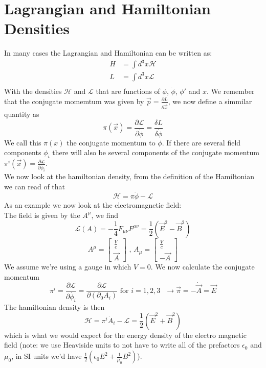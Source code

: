 \documentclass{report}
\begin{document}
\section{Lagrangian and Hamiltonian Densities}
In many cases the Lagrangian and Hamiltonian can be written as:
\begin{align*}
	H &=  \int d^3x \mathcal{H}  \\
	L &= \int d^3x \mathcal{L}  \\
\end{align*} With the densities $\mathcal{H}$ and $\mathcal{L}$ that are functions of $\phi $, $\dot{\phi}$, $\phi'$ and $x$. We remember that the conjugate momemtum was given by $\vec{p} = \frac{\partial L}{\partial \dot{\vec{x}}}  $, we now define a simmilar quantity as \[
\pi(\vec{x}) = \frac{\partial \mathcal{L}}{\partial \dot{\phi}} =  \frac{\delta L}{\delta \dot{\phi}}
\] We call this $\pi(x)$ the conjugate momentum to $\phi$. If there are several field components $\phi_i$ there will also be several components of the conjugate momentum $\pi^i(\vec{x}) = \frac{\partial \mathcal{L}}{\partial \dot{\phi_i}}  $.\\
We now look at the hamiltonian density, from the definition of the Hamiltonian we can read of that \[
	\mathcal{H} = \pi \dot{\phi} - \mathcal{L}
\] As an example we now look at the electromagnetic field:\\
The field is given by the $A^\mu $, we find \[
	\mathcal{L}(A) = -\frac{1}{4} F_{\mu \nu} F^{\mu \nu} = \frac{1}{2} (\vec{E}^2 - \vec{B}^2)
\] \[
A^\mu = \begin{bmatrix} \frac{V}{c} \\ \vec{A} \end{bmatrix} \text{ , } A_\mu = \begin{bmatrix} \frac{V}{c} \\ -\vec{A} \end{bmatrix} 
\] We assume we're using a gauge in which $V = 0$. We now calculate the conjugate momentum \[
\pi^i = \frac{\partial \mathcal{L}}{\partial \dot{\phi_i}} = \frac{\partial \mathcal{L}}{\partial \left( \partial_0 A_i  \right) } \text{ for $i = 1,2,3$ } \to \vec{\pi} = - \dot{\vec{A}} = \vec{E}
\] The hamiltonian density is then \[
\mathcal{H} = \pi^i \dot{A}_i - \mathcal{L} = \frac{1}{2} \left( \vec{E}^2 + \vec{B}^2 \right) 
\] which is what we would expect for the energy density of the electro magnetic field (note: we use Heaviside units to not have to write all of the prefactors $\epsilon_0$ and $\mu_0$, in SI units we'd have $\frac{1}{2} \left( \epsilon_0 E^2 + \frac{1}{\mu_0} B^2 \right) $).\\
\end{document}
